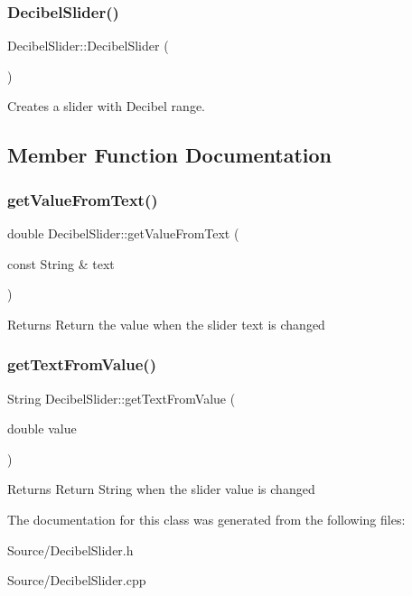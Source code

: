 \subsubsection{\texorpdfstring{DecibelSlider()}{DecibelSlider()}}
{\footnotesize\ttfamily Decibel\+Slider\+::\+Decibel\+Slider (\begin{DoxyParamCaption}{ }\end{DoxyParamCaption})}

Creates a slider with Decibel range. 

\subsection{Member Function Documentation}
\mbox{\label{class_decibel_slider_a18445cf6cf6d356e772085b5b4551b9a}} 
\subsubsection{\texorpdfstring{getValueFromText()}{getValueFromText()}}
{\footnotesize\ttfamily double Decibel\+Slider\+::get\+Value\+From\+Text (\begin{DoxyParamCaption}\item[{const String \&}]{text }\end{DoxyParamCaption})}

\begin{DoxyReturn}{Returns}
Return the value when the slider text is changed 
\end{DoxyReturn}
\mbox{\label{class_decibel_slider_a5fe910f745531b7c9eec653a3a7a6405}} 
\subsubsection{\texorpdfstring{getTextFromValue()}{getTextFromValue()}}
{\footnotesize\ttfamily String Decibel\+Slider\+::get\+Text\+From\+Value (\begin{DoxyParamCaption}\item[{double}]{value }\end{DoxyParamCaption})}

\begin{DoxyReturn}{Returns}
Return String when the slider value is changed 
\end{DoxyReturn}


The documentation for this class was generated from the following files\+:\begin{DoxyCompactItemize}
\item 
Source/Decibel\+Slider.\+h\item 
Source/Decibel\+Slider.\+cpp\end{DoxyCompactItemize}
